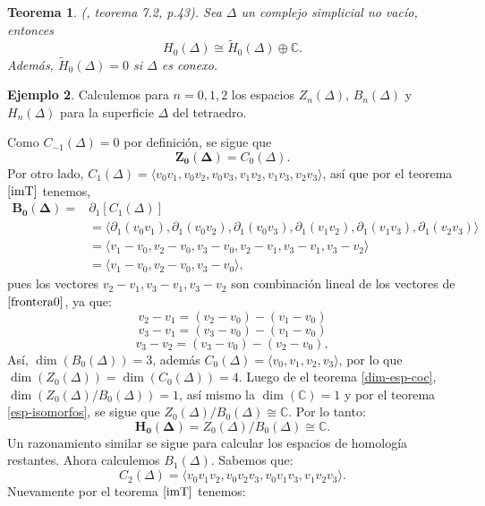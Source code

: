 \documentclass[12pt]{book}
\newtheorem{theorem}{Teorema}[section]
\theoremstyle{definition}
\newtheorem{example}[theorem]{Ejemplo}
\newcounter{in}
\newcounter{ini}
\begin{document}
\begin{theorem}{\normalfont(\cite{munkres1984elements}, teorema 7.2, p.43)}.
  Sea $\Delta$ un complejo simplicial no vacío, entonces
  $$H_{0}(\Delta)\cong \widetilde H_{0}(\Delta)\oplus
  \mathbb{C}.$$
  Además, $\widetilde H_{0}(\Delta)=0$ si $\Delta$ es conexo.
\end{theorem}

\begin{example}
  Calculemos para $n=0, 1, 2$ los espacios $Z_{n}(\Delta)$,
  $B_{n}(\Delta)$ y~$H_{n}(\Delta)$ para la superficie $\Delta$ del tetraedro.

  Como $C_{-1}(\Delta)=0$ por definición, se sigue que
  $$\boldsymbol{Z_{0}(\Delta)}=C_{0}(\Delta).$$
  Por otro lado, $C_{1}(\Delta)=\langle v_{0}v_{1},v_{0}v_{2},v_{0}v_{3},v_{1}v_{2},v_{1}v_{3},v_{2}v_{3}\rangle$,
  así que por el teorema $\ref{imT}$ tenemos, 
  \begin{align}
    \label{frontera0}
    \boldsymbol{B_{0}(\Delta)}=&\partial_{1}[C_{1}(\Delta)]\nonumber\\
    &=\langle \partial_{1}(v_{0}v_{1}),\partial_{1}(v_{0}v_{2}),\partial_{1}(v_{0}v_{3}),\partial_{1}(v_{1}v_{2}),\partial_{1}(v_{1}v_{3}),\partial_{1}(v_{2}v_{3})\rangle\nonumber\\
    &=\langle v_{1}-v_{0},v_{2}-v_{0},v_{3}-v_{0},v_{2}-v_{1},v_{3}-v_{1},v_{3}-v_{2}\rangle\nonumber\\
    &=\langle v_{1}-v_{0},v_{2}-v_{0},v_{3}-v_{0}\rangle,
  \end{align} 
  pues los vectores $v_{2}-v_{1}, v_{3}-v_{1}, v_{3}-v_{2}$ son
  combinación lineal de los vectores de $\ref{frontera0}$, ya que:
  $$v_{2}-v_{1}=(v_{2}-v_{0})-(v_{1}-v_{0})$$
  $$v_{3}-v_{1}=(v_{3}-v_{0})-(v_{1}-v_{0})$$
  $$v_{3}-v_{2}=(v_{3}-v_{0})-(v_{2}-v_{0}),$$
  Así, $\dim(B_{0}(\Delta))=3$, además $C_{0}(\Delta)=\langle
  v_{0},v_{1},v_{2},v_{3}\rangle$, por lo que
 $\dim(Z_{0}(\Delta))=\dim(C_{0}(\Delta))=4$. Luego de el teorema
 \ref{dim-esp-coc}, $\dim(Z_{0}(\Delta)/B_{0}(\Delta))=1$, así mismo
 la $\dim(\mathbb{C})=1$ y por el teorema \ref{esp-isomorfos}, se
 sigue que $Z_{0}(\Delta)/B_{0}(\Delta)\cong \mathbb{C}$.
 Por lo tanto:
 $$\boldsymbol{H_{0}(\Delta)}=Z_{0}(\Delta)/B_{0}(\Delta)\cong \mathbb{C}.$$
 Un razonamiento similar se sigue para calcular los espacios de homología restantes.
 Ahora calculemos $B_{1}(\Delta)$. Sabemos que:
 $$C_{2}(\Delta)=\langle
 v_{0}v_{1}v_{2},v_{0}v_{2}v_{3},v_{0}v_{1}v_{3},v_{1}v_{2}v_{3}\rangle.$$
 Nuevamente por el teorema $\ref{imT}$ tenemos:
 \begin{align}  

\end{align}
\end{example}
\end{document}
